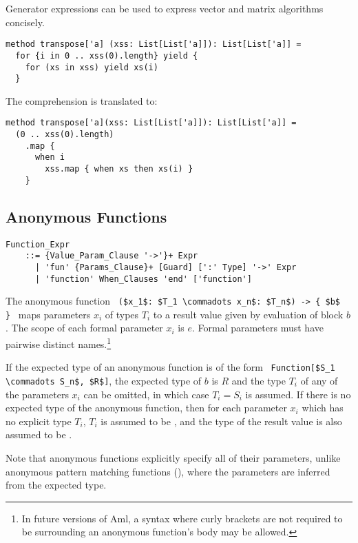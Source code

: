 \example Generator expressions can be used to express vector and matrix algorithms concisely.
\begin{lstlisting}
method transpose['a] (xss: List[List['a]]): List[List['a]] =
  for {i in 0 .. xss(0).length} yield {
    for (xs in xss) yield xs(i)
  }
\end{lstlisting} 
The comprehension is translated to: 
\begin{lstlisting}
method transpose['a](xss: List[List['a]]): List[List['a]] = 
  (0 .. xss(0).length)
    .map { 
      when i 
        xss.map { when xs then xs(i) }
    }
\end{lstlisting}






\subsection{Anonymous Functions}
\label{sec:anonymous-functions}

\grammar\begin{lstlisting}
Function_Expr
    ::= {Value_Param_Clause '->'}+ Expr
      | 'fun' {Params_Clause}+ [Guard] [':' Type] '->' Expr
      | 'function' When_Clauses 'end' ['function']
\end{lstlisting}

The anonymous function ~\lstinline!($x_1$: $T_1 \commadots x_n$: $T_n$) -> { $b$ }!~ maps parameters $x_i$ of types $T_i$ to a result value given by evaluation of block $b$. The scope of each formal parameter $x_i$ is $e$. Formal parameters must have pairwise distinct names.\footnote{In future versions of Aml, a syntax where curly brackets are not required to be surrounding an anonymous function's body may be allowed.}

If the expected type of an anonymous function is of the form ~\lstinline!Function[$S_1 \commadots S_n$, $R$]!, the expected type of $b$ is $R$ and the type $T_i$ of any of the parameters $x_i$ can be omitted, in which case $T_i = S_i$ is assumed. If there is no expected type of the anonymous function, then for each parameter $x_i$ which has no explicit type $T_i$, $T_i$ is assumed to be , and the type of the result value is also assumed to be . 

Note that anonymous functions explicitly specify all of their parameters, unlike anonymous pattern matching functions (), where the parameters are inferred from the expected type. 

